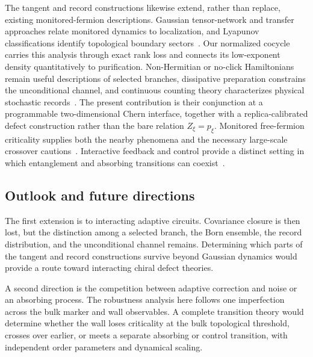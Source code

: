 \documentclass[aps,prx,twocolumn,superscriptaddress,longbibliography,nofootinbib,floatfix]{revtex4-2}
\begin{document}
The tangent and record constructions likewise extend, rather than replace, existing monitored-fermion descriptions.  Gaussian tensor-network and transfer approaches relate monitored dynamics to localization, and Lyapunov classifications identify topological boundary sectors~\cite{Jian2022,PanShapourianJian2025,XiaoKawabata2026,Oshima2025}.  Our normalized cocycle carries this analysis through exact rank loss and connects its low-exponent density quantitatively to purification.  Non-Hermitian or no-click Hamiltonians remain useful descriptions of selected branches, dissipative preparation constrains the unconditional channel, and continuous counting theory characterizes physical stochastic records~\cite{Gong2018,Goldstein2019,Landi2024,Starchl2025}.  The present contribution is their conjunction at a programmable two-dimensional Chern interface, together with a replica-calibrated defect construction rather than the bare relation $Z_\xi=p_\xi$.  Monitored free-fermion criticality supplies both the nearby phenomena and the necessary large-scale crossover cautions~\cite{AlbertonBuchholdDiehl2021,FavaPiroliSwann2023,ChahineBuchhold2024,NiedereggerVovkStarchl2026}.  Interactive feedback and control provide a distinct setting in which entanglement and absorbing transitions can coexist~\cite{IadecolaGaneshanPixley2023,ODeaMorningstarGopalakrishnan2024,PanGaneshanIadecola2024}.

\subsection{Outlook and future directions}
\label{sec:outlook}

The first extension is to interacting adaptive circuits.  Covariance closure is then lost, but the distinction among a selected branch, the Born ensemble, the record distribution, and the unconditional channel remains.  Determining which parts of the tangent and record constructions survive beyond Gaussian dynamics would provide a route toward interacting chiral defect theories.

A second direction is the competition between adaptive correction and noise or an absorbing process.  The robustness analysis here follows one imperfection across the bulk marker and wall observables.  A complete transition theory would determine whether the wall loses criticality at the bulk topological threshold, crosses over earlier, or meets a separate absorbing or control transition, with independent order parameters and dynamical scaling.
\end{document}
